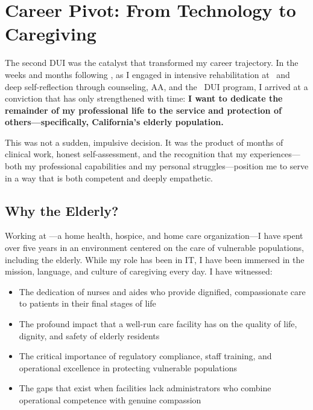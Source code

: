 \section{Career Pivot: From Technology to Caregiving}

The second DUI was the catalyst that transformed my career trajectory. In the weeks and months following \IncidentTwoDate, as I engaged in intensive rehabilitation at \RehabProgram\ and deep self-reflection through counseling, AA, and the \DUIProgramTwoDuration\ DUI program, I arrived at a conviction that has only strengthened with time: \textbf{I want to dedicate the remainder of my professional life to the service and protection of others---specifically, California's elderly population.}

This was not a sudden, impulsive decision. It was the product of months of clinical work, honest self-assessment, and the recognition that my experiences---both my professional capabilities and my personal struggles---position me to serve in a way that is both competent and deeply empathetic.

\subsection{Why the Elderly?}

Working at \EmployerName---a home health, hospice, and home care organization---I have spent over five years in an environment centered on the care of vulnerable populations, including the elderly. While my role has been in IT, I have been immersed in the mission, language, and culture of caregiving every day. I have witnessed:

\begin{itemize}[leftmargin=2em, itemsep=0.2em]
  \item The dedication of nurses and aides who provide dignified, compassionate care to patients in their final stages of life
  \item The profound impact that a well-run care facility has on the quality of life, dignity, and safety of elderly residents
  \item The critical importance of regulatory compliance, staff training, and operational excellence in protecting vulnerable populations
  \item The gaps that exist when facilities lack administrators who combine operational competence with genuine compassion
\end{itemize}

